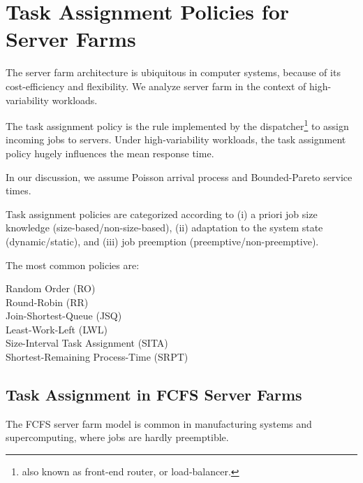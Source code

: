 \section{Task Assignment Policies for Server Farms}
\label{sec:task-assignment-policies-server-farms}

The server farm architecture is ubiquitous in computer systems, because of its cost-efficiency and flexibility.
We analyze server farm in the context of high-variability workloads.

The task assignment policy is the rule implemented by the dispatcher\footnote{also known as front-end router, or load-balancer.} to assign incoming jobs to servers.
Under high-variability workloads, the task assignment policy hugely influences the mean response time.

In our discussion, we assume Poisson arrival process and Bounded-Pareto service times.


Task assignment policies are categorized according to (i) a priori job size knowledge (size-based/non-size-based), (ii) adaptation to the system state (dynamic/static), and (iii) job preemption (preemptive/non-preemptive).

The most common policies are:

\begin{description}
	
	\item [Random Order (RO)]
	
	\item [Round-Robin (RR)]
	
	\item [Join-Shortest-Queue (JSQ)]
	
	\item [Least-Work-Left (LWL)]
	
	\item [Size-Interval Task Assignment (SITA)]
	
	\item [Shortest-Remaining Process-Time (SRPT)]
\end{description}




\subsection{Task Assignment in FCFS Server Farms}
\label{sec:task-assignment-fcfs-server-farms}
The FCFS server farm model is common in manufacturing systems and supercomputing, where jobs are hardly preemptible.

